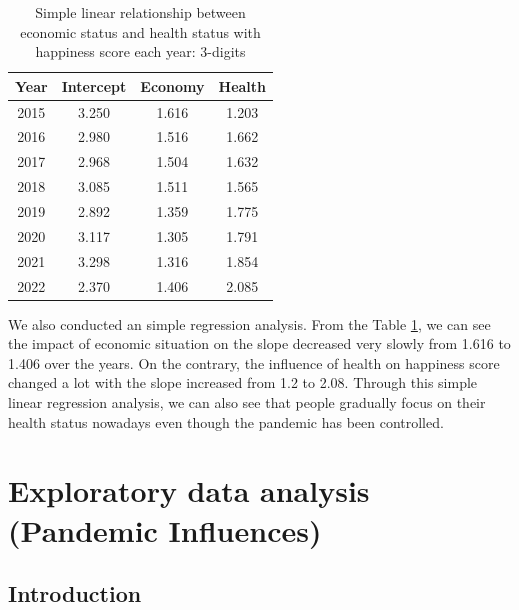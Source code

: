 \documentclass[11pt,a4paper,]{article}
\begin{document}
\newpage

\begin{table}
\centering
\begin{tabular}{|c|c|c|c|}
\hline
\textbf{Year} & \textbf{Intercept} & \textbf{Economy} & \textbf{Health} \\
\hline
2015          & 3.250              & 1.616            & 1.203           \\
2016          & 2.980              & 1.516            & 1.662           \\
2017          & 2.968              & 1.504            & 1.632           \\
2018          & 3.085              & 1.511            & 1.565           \\
2019          & 2.892              & 1.359            & 1.775           \\
2020          & 3.117              & 1.305            & 1.791           \\
2021          & 3.298              & 1.316            & 1.854           \\
2022          & 2.370              & 1.406            & 2.085           \\
\hline
\end{tabular}
\caption{Simple linear relationship between economic status and health status with happiness score each year: 3-digits}
\label{tab:table}
\end{table}

We also conducted an simple regression analysis. From the Table \ref{tab:table}, we can see the impact of economic situation on the slope decreased very slowly from 1.616 to 1.406 over the years. On the contrary, the influence of health on happiness score changed a lot with the slope increased from 1.2 to 2.08. Through this simple linear regression analysis, we can also see that people gradually focus on their health status nowadays even though the pandemic has been controlled.

\newpage

\hypertarget{exploratory-data-analysis-pandemic-influences}{%
\section{Exploratory data analysis (Pandemic Influences)}\label{exploratory-data-analysis-pandemic-influences}}

\hypertarget{introduction-1}{%
\subsection{Introduction}\label{introduction-1}}
\end{document}
